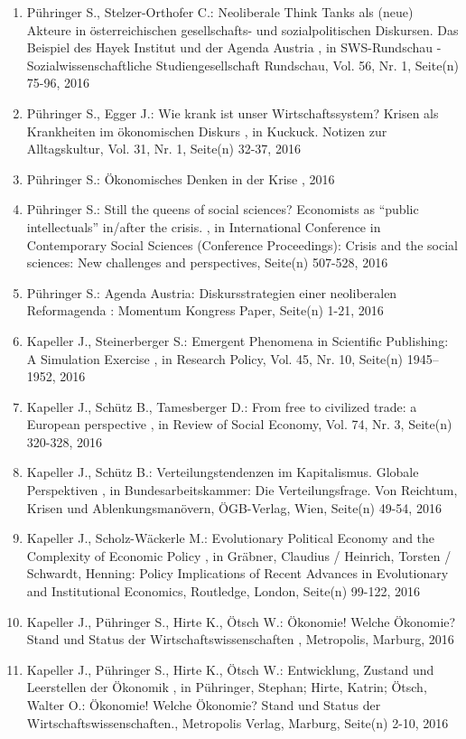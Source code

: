\begin{enumerate}[leftmargin=*, labelsep=0.5cm]
	 \item Pühringer S., Stelzer-Orthofer C.:  Neoliberale Think Tanks als (neue) Akteure in österreichischen gesellschafts- und sozialpolitischen Diskursen. Das Beispiel des Hayek Institut und der Agenda Austria  , in SWS-Rundschau - Sozialwissenschaftliche Studiengesellschaft Rundschau, Vol. 56, Nr. 1, Seite(n) 75-96, 2016
	 \item Pühringer S., Egger J.:  Wie krank ist unser Wirtschaftssystem? Krisen als Krankheiten im ökonomischen Diskurs  , in Kuckuck. Notizen zur Alltagskultur, Vol. 31, Nr. 1, Seite(n) 32-37, 2016
	 \item Pühringer S.:  Ökonomisches Denken in der Krise  , 2016
	 \item Pühringer S.:  Still the queens of social sciences? Economists as “public intellectuals” in/after the crisis.  , in International Conference in Contemporary Social Sciences (Conference Proceedings): Crisis and the social sciences: New challenges and perspectives, Seite(n) 507-528, 2016
	 \item Pühringer S.:  Agenda Austria: Diskursstrategien einer neoliberalen Reformagenda  : Momentum Kongress Paper, Seite(n) 1-21, 2016
	 \item Kapeller J., Steinerberger S.:  Emergent Phenomena in Scientific Publishing: A Simulation Exercise  , in Research Policy, Vol. 45, Nr. 10, Seite(n) 1945–1952, 2016
	 \item Kapeller J., Schütz B., Tamesberger D.:  From free to civilized trade: a European perspective  , in Review of Social Economy, Vol. 74, Nr. 3, Seite(n) 320-328, 2016
	 \item Kapeller J., Schütz B.:  Verteilungstendenzen im Kapitalismus. Globale Perspektiven  , in Bundesarbeitskammer: Die Verteilungsfrage. Von Reichtum, Krisen und Ablenkungsmanövern, ÖGB-Verlag, Wien, Seite(n) 49-54, 2016
	 \item Kapeller J., Scholz-Wäckerle M.:  Evolutionary Political Economy and the Complexity of Economic Policy  , in Gräbner,  Claudius / Heinrich, Torsten / Schwardt, Henning: Policy  Implications of Recent Advances in Evolutionary and Institutional  Economics, Routledge, London, Seite(n) 99-122, 2016
	 \item Kapeller J., Pühringer S., Hirte K., Ötsch W.:  Ökonomie! Welche Ökonomie? Stand und Status der Wirtschaftswissenschaften  , Metropolis, Marburg, 2016
	 \item Kapeller J., Pühringer S., Hirte K., Ötsch W.:  Entwicklung, Zustand und Leerstellen der Ökonomik  , in Pühringer, Stephan; Hirte, Katrin; Ötsch, Walter O.: Ökonomie! Welche Ökonomie? Stand und Status der Wirtschaftswissenschaften., Metropolis Verlag, Marburg, Seite(n) 2-10, 2016

\end{enumerate}
